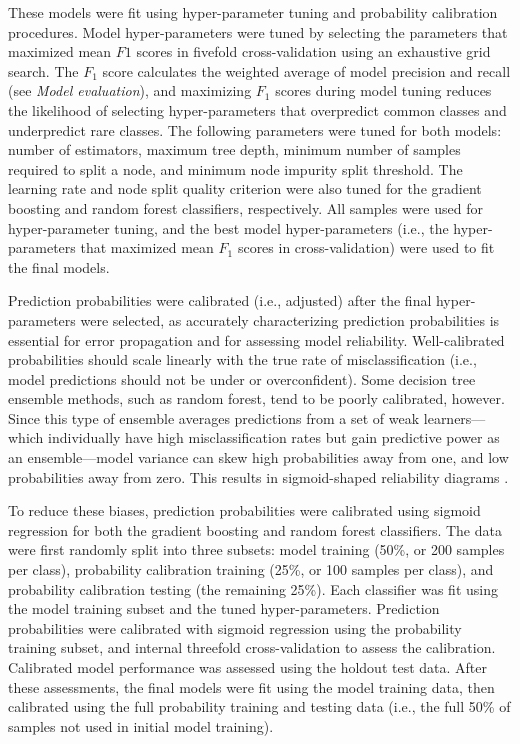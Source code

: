 These models were fit using hyper-parameter tuning and probability calibration procedures. Model hyper-parameters were tuned by selecting the parameters that maximized mean $F1$ scores in fivefold cross-validation using an exhaustive grid search. The $F_1$ score calculates the weighted average of model precision and recall (see \textit{Model evaluation}), and maximizing $F_1$ scores during model tuning reduces the likelihood of selecting hyper-parameters that overpredict common classes and underpredict rare classes. The following parameters were tuned for both models: number of estimators, maximum tree depth, minimum number of samples required to split a node, and minimum node impurity split threshold. The learning rate and node split quality criterion were also tuned for the gradient boosting and random forest classifiers, respectively. All samples were used for hyper-parameter tuning, and the best model hyper-parameters (i.e., the hyper-parameters that maximized mean $F_1$ scores in cross-validation) were used to fit the final models.

Prediction probabilities were calibrated (i.e., adjusted) after the final hyper-parameters were selected, as accurately characterizing prediction probabilities is essential for error propagation and for assessing model reliability. Well-calibrated probabilities should scale linearly with the true rate of misclassification (i.e., model predictions should not be under or overconfident). Some decision tree ensemble methods, such as random forest, tend to be poorly calibrated, however. Since this type of ensemble averages predictions from a set of weak learners—which individually have high misclassification rates but gain predictive power as an ensemble—model variance can skew high probabilities away from one, and low probabilities away from zero. This results in sigmoid-shaped reliability diagrams \cite{DeGroot1983-nc, Niculescu-Mizil2005-nd}.

To reduce these biases, prediction probabilities were calibrated using sigmoid regression for both the gradient boosting and random forest classifiers. The data were first randomly split into three subsets: model training (50\%, or 200 samples per class), probability calibration training (25\%, or 100 samples per class), and probability calibration testing (the remaining 25\%). Each classifier was fit using the model training subset and the tuned hyper-parameters. Prediction probabilities were calibrated with sigmoid regression using the probability training subset, and internal threefold cross-validation to assess the calibration. Calibrated model performance was assessed using the holdout test data. After these assessments, the final models were fit using the model training data, then calibrated using the full probability training and testing data (i.e., the full 50\% of samples not used in initial model training).

